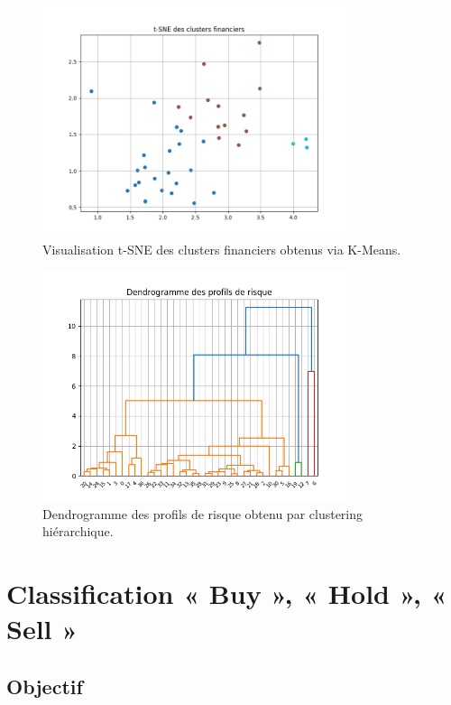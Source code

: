 \documentclass[a4paper,12pt]{article}
\begin{document}
\begin{figure}[h!]
    \centering
    \includegraphics[width=0.8\textwidth]{t_sne.png}
    \caption{Visualisation t-SNE des clusters financiers obtenus via K-Means.}
    \label{fig:tsne_financial}
\end{figure}

\begin{figure}[h!]
    \centering
    \includegraphics[width=0.8\textwidth]{dendogramme.png}
    \caption{Dendrogramme des profils de risque obtenu par clustering hiérarchique.}
    \label{fig:dendrogram_risk}
\end{figure}


\section{Classification « Buy », « Hold », « Sell »}

\subsection*{Objectif}
\end{document}
